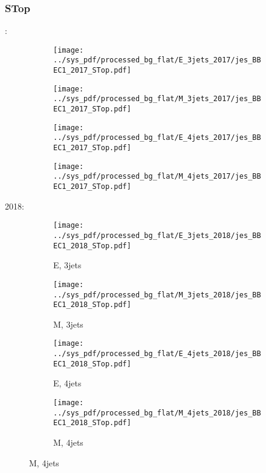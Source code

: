 \documentclass{beamer}
\begin{document}
\begin{frame}
\frametitle{STop}
\fontsize{5}{1}:
\begin{figure}
\centering
\begin{subfigure}[b]{0.24\textwidth}
\texttt{[image: ../sys\_pdf/processed\_bg\_flat/E\_3jets\_2017/jes\_BBEC1\_2017\_STop.pdf]}
\end{subfigure}
\begin{subfigure}[b]{0.24\textwidth}
\texttt{[image: ../sys\_pdf/processed\_bg\_flat/M\_3jets\_2017/jes\_BBEC1\_2017\_STop.pdf]}
\end{subfigure}
\begin{subfigure}[b]{0.24\textwidth}
\texttt{[image: ../sys\_pdf/processed\_bg\_flat/E\_4jets\_2017/jes\_BBEC1\_2017\_STop.pdf]}
\end{subfigure}
\begin{subfigure}[b]{0.24\textwidth}
\texttt{[image: ../sys\_pdf/processed\_bg\_flat/M\_4jets\_2017/jes\_BBEC1\_2017\_STop.pdf]}
\end{subfigure}
\end{figure}
2018:
\begin{figure}
\centering
\begin{subfigure}[b]{0.24\textwidth}
\texttt{[image: ../sys\_pdf/processed\_bg\_flat/E\_3jets\_2018/jes\_BBEC1\_2018\_STop.pdf]}
\captionsetup{font=tiny}
\caption{E, 3jets}
\end{subfigure}
\begin{subfigure}[b]{0.24\textwidth}
\texttt{[image: ../sys\_pdf/processed\_bg\_flat/M\_3jets\_2018/jes\_BBEC1\_2018\_STop.pdf]}
\captionsetup{font=tiny}
\caption{M, 3jets}
\end{subfigure}
\begin{subfigure}[b]{0.24\textwidth}
\texttt{[image: ../sys\_pdf/processed\_bg\_flat/E\_4jets\_2018/jes\_BBEC1\_2018\_STop.pdf]}
\captionsetup{font=tiny}
\caption{E, 4jets}
\end{subfigure}
\begin{subfigure}[b]{0.24\textwidth}
\texttt{[image: ../sys\_pdf/processed\_bg\_flat/M\_4jets\_2018/jes\_BBEC1\_2018\_STop.pdf]}
\captionsetup{font=tiny}
\caption{M, 4jets}
\end{subfigure}
\end{figure}
\end{frame}
\end{document}

